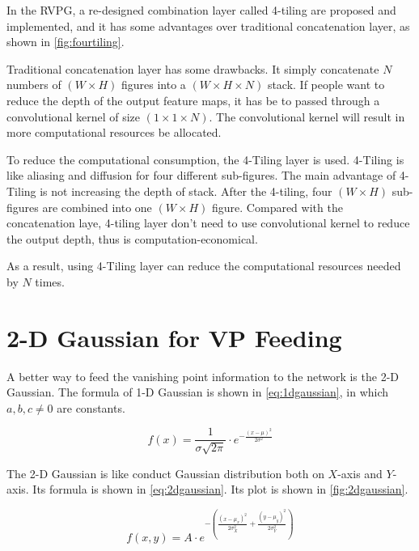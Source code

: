 \begin{spacing}{1.5}
In the RVPG, a re-designed combination layer called 4-tiling are proposed and implemented, and it has some advantages over traditional concatenation layer, as shown in \autoref{fig:fourtiling}.

Traditional concatenation layer has some drawbacks. It simply concatenate $N$ numbers of $(W \times H)$ figures into a $(W \times H \times N)$ stack. If people want to reduce the depth of the output feature maps, it has be to passed through a convolutional kernel of size $(1 \times 1 \times N)$. The convolutional kernel will result in more computational resources be allocated.

To reduce the computational consumption, the 4-Tiling layer is used. 4-Tiling is like aliasing and diffusion for four different sub-figures. The main advantage of 4-Tiling is not increasing the depth of stack. After the 4-tiling, four $(W \times H)$ sub-figures are combined into one $(W \times H)$ figure. Compared with the concatenation laye, 4-tiling layer don't need to use convolutional kernel to reduce the output depth, thus is computation-economical.

As a result, using 4-Tiling layer can reduce the computational resources needed by $N$ times.

\section{2-D Gaussian for VP Feeding}
\label{sec:MD_2D}

A better way to feed the vanishing point information to the network is the 2-D Gaussian. The formula of 1-D Gaussian is shown in \autoref{eq:1dgaussian}, in which $a,b,c \neq 0$ are constants.

\begin{equation}
\label{eq:1dgaussian}
    f(x)=\frac{1}{\sigma \sqrt{2 \pi }} \cdot e^{-\frac{(x- \mu )^2}{2 \sigma^2}}
\end{equation}

The 2-D Gaussian is like conduct Gaussian distribution both on $X$-axis and $Y$-axis. Its formula is shown in \autoref{eq:2dgaussian}. Its plot is shown in \autoref{fig:2dgaussian}.

\begin{equation}
\label{eq:2dgaussian}
    f(x,y)= A \cdot e^{-\left(\frac{(x- \mu_x )^2}{2 \sigma_{X}^{2}}+\frac{(y- \mu_y )^2}{2 \sigma_{Y}^{2}}\right)}
\end{equation}


\end{spacing}

